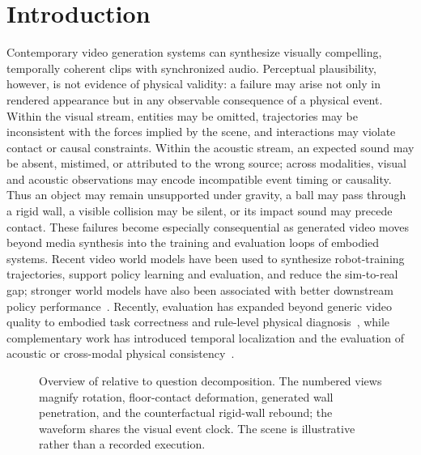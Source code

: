 \section{Introduction}\label{sec:intro}

Contemporary video generation systems can synthesize visually compelling,
temporally coherent clips with synchronized audio. Perceptual plausibility,
however, is not evidence of physical validity: a failure may arise not only in
rendered appearance but in any observable consequence of a physical event.
Within the visual stream, entities may be omitted, trajectories may be
inconsistent with the forces implied by the scene, and interactions may violate
contact or causal constraints. Within the acoustic stream, an expected sound
may be absent, mistimed, or attributed to the wrong source; across modalities,
visual and acoustic observations may encode incompatible event timing or
causality. Thus an object may remain unsupported under gravity, a ball may pass
through a rigid wall, a visible collision may be silent, or its impact sound may
precede contact. These failures become especially consequential as generated
video moves beyond media synthesis into the training and evaluation loops of
embodied systems. Recent video world models have been used to synthesize
robot-training trajectories, support policy learning and evaluation, and reduce
the sim-to-real gap; stronger world models have also been associated with better
downstream policy
performance~\cite{jang2025dreamgen,huang2025enerverse,shang2025roboscape}.
Recently, evaluation has expanded beyond generic video quality to embodied task
correctness and rule-level physical
diagnosis~\cite{li2025worldmodelbench,deng2026rethinking,videophy2_2025,lin2026phyground},
while complementary work has introduced temporal localization and the evaluation
of acoustic or cross-modal physical consistency~\cite{physioneval2026,chinchure2026spotlight,xie2025phyavbench,cui2026avphys}.

\begin{figure}[t]
  \centering
  
  \caption{Overview of \PhyReAct{} relative to question decomposition. The
  numbered views magnify rotation, floor-contact deformation, generated wall
  penetration, and the counterfactual rigid-wall rebound; the waveform shares
  the visual event clock. The scene is illustrative rather than a recorded
  execution.}
  \label{fig:teaser}
\end{figure}
\FloatBarrier


